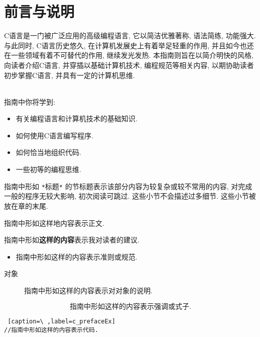 \chapter*{前言与说明}
 \label{前言与说明}

    C语言是一门被广泛应用的高级编程语言, 它以简洁优雅著称, 语法简练, 功能强大. 与此同时, C语言历史悠久, 在计算机发展史上有着举足轻重的作用, 并且如今也还在一些领域有着不可替代的作用, 继续发光发热. 本指南则旨在以简介明快的风格, 向读者介绍C语言, 并穿插以基础计算机技术, 编程规范等相关内容, 以期协助读者初步掌握C语言, 并具有一定的计算机思维. 

    \leavevmode \\
    指南中你将学到:
    \begin{itemize}
        \item 有关编程语言和计算机技术的基础知识.
        \item 如何使用C语言编写程序.
        \item 如何恰当地组织代码.
        \item 一些初等的编程思维.
    \end{itemize}

    \vspace*{5pt}

    指南中形如 \texttt{*}标题\texttt{*} 的节标题表示该部分内容为较复杂或较不常用的内容, 对完成一般的程序无较大影响, 初次阅读可跳过. 这些小节不会描述过多细节. 这些小节被放在章的末尾.

    \vspace*{5pt}
    指南中形如这样地内容表示正文. 

    \vspace*{5pt}
    指南中形如\textbf{这样的内容}表示我对读者的建议.

    \begin{itemize}
        \item 指南中形如这样的内容表示准则或规范.
    \end{itemize}

    \begin{description}
        \item[对象] 指南中形如这样的内容表示对对象的说明. 
    \end{description}

    \vspace*{-20pt}
        \[ \mbox{指南中形如这样的内容表示强调或式子.} \]

\begin{lstlisting} [caption=\ ,label=c_prefaceEx]
//指南中形如这样的内容表示代码.
\end{lstlisting}

